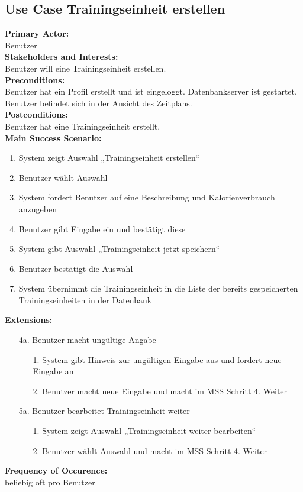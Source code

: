 \documentclass[12pt,a4paper,onecolumn]{article}
\begin{document}
\subsection{Use Case  Trainingseinheit erstellen}
\textbf{Primary Actor:}\\ Benutzer\\
\textbf{Stakeholders and Interests:}\\
Benutzer will eine Trainingseinheit erstellen.\\
\textbf{Preconditions:} \\ Benutzer hat ein Profil erstellt und ist eingeloggt. 
Datenbankserver ist gestartet. Benutzer befindet sich in der Ansicht des Zeitplans.\\
\textbf{Postconditions:}\\Benutzer hat eine Trainingseinheit erstellt.\\
\textbf{Main Success Scenario:}
\begin{enumerate}
    \item System zeigt Auswahl „Trainingseinheit erstellen“
    \item Benutzer wählt Auswahl
    \item System fordert Benutzer auf eine Beschreibung und Kalorienverbrauch anzugeben
    \item Benutzer gibt Eingabe ein und bestätigt diese
    \item System gibt Auswahl „Trainingseinheit jetzt speichern“
    \item Benutzer bestätigt die Auswahl
    \item System übernimmt die Trainingseinheit in die Liste der bereits gespeicherten Trainingseinheiten in der Datenbank
\end{enumerate}
\textbf{Extensions:}
\begin{enumerate}
    \item [4a.]   Benutzer macht ungültige Angabe
    \begin{enumerate}
        \item[1.]System gibt Hinweis zur ungültigen Eingabe aus und fordert neue Eingabe an
        \item[2.]Benutzer macht neue Eingabe und macht im MSS Schritt 4. Weiter
    \end{enumerate}
    \item [5a.]Benutzer bearbeitet Trainingseinheit weiter
    \begin{enumerate}
        \item[1.]System zeigt Auswahl „Trainingseinheit weiter bearbeiten“
        \item[2.]Benutzer wählt Auswahl und macht im MSS Schritt 4. Weiter
    \end{enumerate}
\end{enumerate}
\textbf{Frequency of Occurence:}\\beliebig oft pro Benutzer  \\
\end{document}
